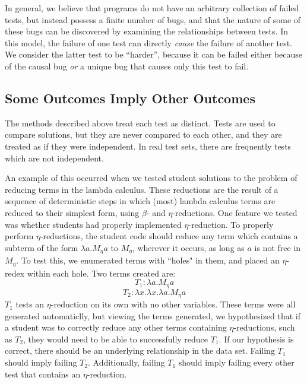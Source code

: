 \documentclass[11pt,twoside]{article}
\theoremstyle{definition}
\begin{document}
In general, we believe that programs do not have an arbitrary collection of failed tests, but instead possess a finite number of bugs, and that the nature of some of these bugs can be discovered by examining the relationships between tests. In this model, the failure of one test can directly \emph{cause} the failure of another test. We consider the latter test to be ``harder'', because it can be failed either because of the causal bug \emph{or} a unique bug that causes only this test to fail.

\subsection{Some Outcomes Imply Other Outcomes}
The methods described above treat each test as distinct. Tests are used to compare solutions, but they are never compared to each other, and they are treated as if they were independent. In real test sets, there are frequently tests which are not independent.

An example of this occurred when we tested student solutions to the problem of reducing terms in the lambda calculus. These reductions are the result of a sequence of deterministic steps in which (most) lambda calculus terms are reduced to their simplest form, using $\beta$- and $\eta$-reductions. One feature we tested was whether students had properly implemented $\eta$-reduction. To properly perform $\eta$-reductions, the student code should reduce any term which contains a subterm of the form $\lambda a.M_\eta a$ to $M_\eta$, wherever it occurs, as long as $a$ is not free in $M_\eta$. To test this, we enumerated terms with ``holes" in them, and placed an $\eta$-redex within each hole. Two terms created are: 
$$T_1 : \lambda a.M_\eta a$$
$$T_2 : \lambda x.\lambda x.\lambda a.M_\eta a$$
$T_1$ tests an $\eta$-reduction on its own with no other variables. These terms were all generated automaticlly, but viewing the terms generated, we hypothesized that if a student was to correctly reduce any other terms containing $\eta$-reductions, such as $T_2$, they would need to be able to successfully reduce $T_1$.
If our hypothesis is correct, there should be an underlying relationship in the data set. Failing $T_1$ should imply failing $T_2$. Additionally, failing $T_1$ should imply failing every other test that contains an $\eta$-reduction.
\end{document}
